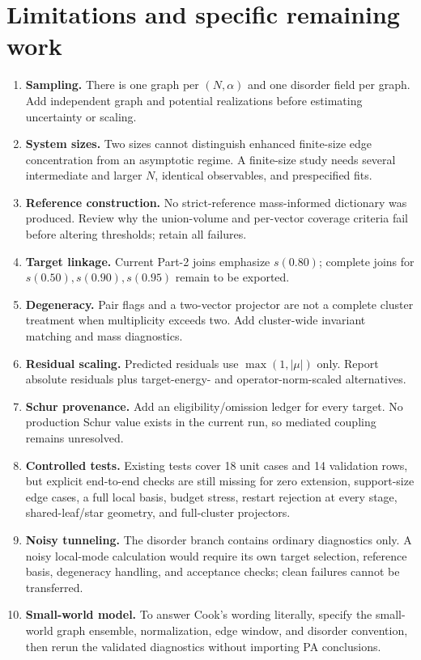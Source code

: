 \documentclass[11pt]{article}
\begin{document}
\section{Limitations and specific remaining work}

\begin{enumerate}
\item \textbf{Sampling.}  There is one graph per \((N,\alpha)\) and one disorder field per graph.  Add independent graph and potential realizations before estimating uncertainty or scaling.
\item \textbf{System sizes.}  Two sizes cannot distinguish enhanced finite-size edge concentration from an asymptotic regime.  A finite-size study needs several intermediate and larger \(N\), identical observables, and prespecified fits.
\item \textbf{Reference construction.}  No strict-reference mass-informed dictionary was produced.  Review why the union-volume and per-vector coverage criteria fail before altering thresholds; retain all failures.
\item \textbf{Target linkage.}  Current Part-2 joins emphasize \(s(0.80)\); complete joins for \(s(0.50),s(0.90),s(0.95)\) remain to be exported.
\item \textbf{Degeneracy.}  Pair flags and a two-vector projector are not a complete cluster treatment when multiplicity exceeds two.  Add cluster-wide invariant matching and mass diagnostics.
\item \textbf{Residual scaling.}  Predicted residuals use \(\max(1,|\mu|)\) only.  Report absolute residuals plus target-energy- and operator-norm-scaled alternatives.
\item \textbf{Schur provenance.}  Add an eligibility/omission ledger for every target.  No production Schur value exists in the current run, so mediated coupling remains unresolved.
\item \textbf{Controlled tests.}  Existing tests cover 18 unit cases and 14 validation rows, but explicit end-to-end checks are still missing for zero extension, support-size edge cases, a full local basis, budget stress, restart rejection at every stage, shared-leaf/star geometry, and full-cluster projectors.
\item \textbf{Noisy tunneling.}  The disorder branch contains ordinary diagnostics only.  A noisy local-mode calculation would require its own target selection, reference basis, degeneracy handling, and acceptance checks; clean failures cannot be transferred.
\item \textbf{Small-world model.}  To answer Cook's wording literally, specify the small-world graph ensemble, normalization, edge window, and disorder convention, then rerun the validated diagnostics without importing PA conclusions.
\end{enumerate}
\end{document}
